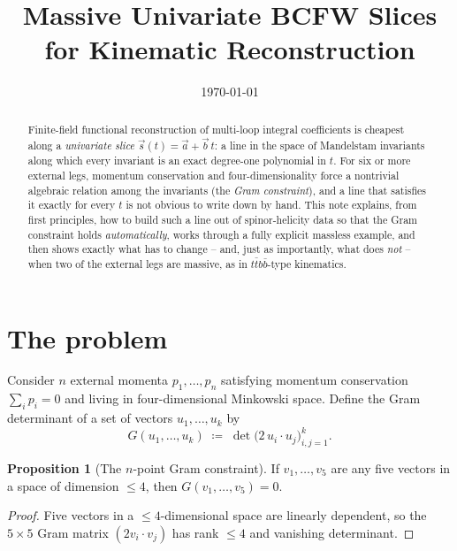 \documentclass[11pt]{article}
\title{Massive Univariate BCFW Slices for Kinematic Reconstruction}
\author{}
\date{\today}
\newcommand{\eqdef}{\coloneqq}
\theoremstyle{definition}
\newtheorem{proposition}{Proposition}
\begin{document}
\maketitle

\begin{abstract}
\noindent
Finite-field functional reconstruction of multi-loop integral coefficients is cheapest along a
\emph{univariate slice} $\vec s(t) = \vec a + \vec b\, t$: a line in the space of Mandelstam
invariants along which every invariant is an exact degree-one polynomial in $t$. For six or more
external legs, momentum conservation and four-dimensionality force a nontrivial algebraic
relation among the invariants (the \emph{Gram constraint}), and a line that satisfies it exactly
for every $t$ is not obvious to write down by hand. This note explains, from first principles,
how to build such a line out of spinor-helicity data so that the Gram constraint holds
\emph{automatically}, works through a fully explicit massless example, and then shows exactly
what has to change -- and, just as importantly, what does \emph{not} -- when two of the external
legs are massive, as in $t\bar t b\bar b$-type kinematics.
\end{abstract}

\section{The problem}

Consider $n$ external momenta $p_1,\dots,p_n$ satisfying momentum conservation
$\sum_i p_i = 0$ and living in four-dimensional Minkowski space. Define the Gram
determinant of a set of vectors $u_1,\dots,u_k$ by
\begin{equation}
G(u_1,\dots,u_k) \;\eqdef\; \det\big(2\, u_i\!\cdot\! u_j\big)_{i,j=1}^k .
\end{equation}

\begin{proposition}[The $n$-point Gram constraint]
\label{prop:gram}
If $v_1,\dots,v_5$ are any five vectors in a space of dimension $\le 4$, then
$G(v_1,\dots,v_5)=0$.
\end{proposition}
\begin{proof}
Five vectors in a $\le\!4$-dimensional space are linearly dependent, so the $5\times 5$ Gram
matrix $(2v_i\cdot v_j)$ has rank $\le 4$ and vanishing determinant.
\end{proof}
\end{document}
